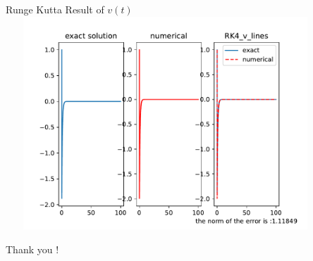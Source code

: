 \documentclass{beamer}
\begin{document}
 \begin{frame}{Runge Kutta Result of $v(t)$}
    \centering
    \includegraphics[height=8cm,width=12cm]{RK4_v_lines.pdf}
 \end{frame}
 \begin{frame}[standout]
    Thank you !
 \end{frame}
\end{document}
